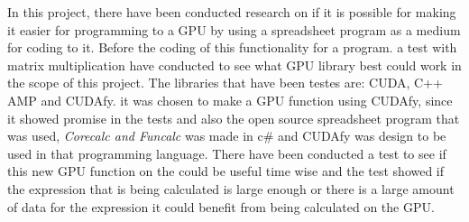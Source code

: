 In this project, there have been conducted research on if it is possible for making it easier for programming to a GPU by using a spreadsheet program as a medium for coding to it. Before the coding of this functionality for a program. a test with matrix multiplication have conducted to see what GPU library best could work in the scope of this project.
The libraries that have been testes are: CUDA, C++ AMP and CUDAfy. it was chosen to make a GPU function using CUDAfy, since it showed promise in the tests and also the open source spreadsheet program that was used, \textit{Corecalc and Funcalc} was made in c\# and CUDAfy was design to be used in that programming language.
There have been conducted a test to see if this new GPU function on the could be useful time wise and the test showed if the expression that is being calculated is large enough or there is a large amount of data for the expression it could benefit from being calculated on the GPU.